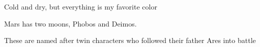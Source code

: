 
Cold and dry, but everything is my favorite color

Mars has two moons, Phobos and Deimos.

These are named after twin characters who followed their father Ares into battle
